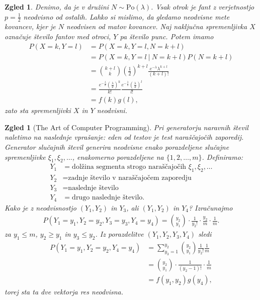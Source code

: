 \documentclass[10pt, a4paper]{article}
\newtheorem{zgled}[izr]{Zgled}
\begin{document}
\begin{zgled}
  Denimo, da je v družini $N \sim \mathrm{Po} (\lambda)$.
  Vsak otrok je fant z verjetnostjo $p = \frac{1}{2}$ neodvisno
  od ostalih. Lahko si mislimo, da gledamo neodvisne mete kovancev,
  kjer je $N$ neodvisen od matov kovancev. Naj naključna spremenljivka $X$ označuje število 
  fantov med otroci, $Y$ pa število punc. Potem imamo 
  \begin{align*}
    P(X = k, Y = l) &= P(X = k, Y = l, N = k + l)\\
    &= P(X = k, Y = l\ |\ N = k + l) P(N = k + l)\\
    &= \binom{k + l}{k} \left(\frac{1}{2}\right)^{k + l} \frac{e^{-\lambda} \lambda^{k + l}}{(k + l)!}\\
    &= \frac{e^{-\frac{\lambda}{2}} \left(\frac{\lambda}{2}\right)^k}{k!} \frac{e^{-\frac{\lambda}{2}} \left(\frac{\lambda}{2}\right)^l}{l!}\\
    &= f(k) g(l),
  \end{align*}
  zato sta spremenljivki $X$ in $Y$ neodvisni.
\end{zgled}

\begin{zgled}[The Art of Computer Programming]
  Pri generatorju naravnih števil naletimo na naslednje vprašanje: eden od testov je test naraščajočih zaporedij.
  Generator slučajnih števil generira neodvisne enako porazdeljene slučajne spremenljivke $\xi_1, \xi_2, \dots$,
  enakomerno porazdeljene na $\{1, 2, \dots, m\}$.
  Definiramo:
  \begin{align*}
    Y_1 &= \text{dolžina segmenta strogo naraščajočih $\xi_1, \xi_2, \dots$}\\
    Y_2 &= \text{zadnje število v naraščajočem zaporedju}\\
    Y_3 &= \text{naslednje število}\\
    Y_4 &= \text{drugo naslednje število}.
  \end{align*}
  Kako je z neodvisnostjo $(Y_1, Y_2)$ in $Y_3$, ali $(Y_1, Y_2)$ in $Y_4$?
  Izračunajmo 
  \begin{align*}
    P(Y_1 = y_1, Y_2 = y_2, Y_3 = y_3, Y_4 = y_4) = \binom{y_2}{y_1} \cdot \frac{1}{y_2!} \cdot \frac{y_2}{m} \cdot \frac{1}{m}.
  \end{align*}
  za $y_1 \leq m$, $y_2 \geq y_1$ in $y_3 \leq y_2$.
  Iz porazdelitve $(Y_1, Y_2, Y_3, Y_4)$ sledi 
  \begin{align*}
    P(Y_1 = y_1, Y_2 = y_2, Y_4 = y_4) &= \sum_{y_3 = 1}^{y_2} \binom{y_2}{y_1} \frac{1}{y_2!} \frac{1}{m}\\
    &= \binom{y_2}{y_1} \cdot \frac{1}{(y_2 - 1)!} \cdot \frac{1}{m}\\
    &=f(y_1, y_2) g(y_4),
  \end{align*}
  torej sta ta dve vektorja res neodvisna.
\end{zgled}
\end{document}
